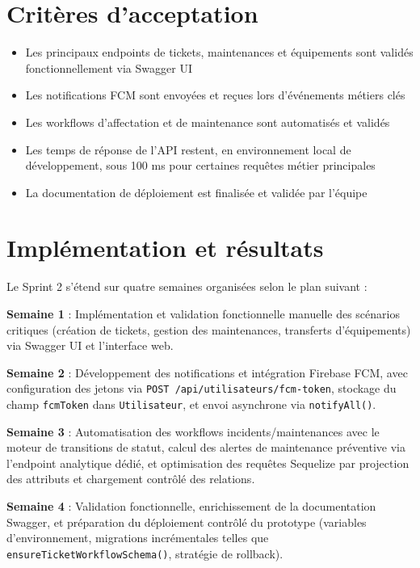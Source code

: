 \section{Critères d'acceptation}
\label{sec:acceptance_criteria_sprint2}

\begin{itemize}
    \item Les principaux endpoints de tickets, maintenances et équipements sont validés fonctionnellement via Swagger UI
    \item Les notifications FCM sont envoyées et reçues lors d'événements métiers clés
    \item Les workflows d'affectation et de maintenance sont automatisés et validés
    \item Les temps de réponse de l'API restent, en environnement local de développement, sous 100 ms pour certaines requêtes métier principales
    \item La documentation de déploiement est finalisée et validée par l'équipe
\end{itemize}

\section{Implémentation et résultats}
\label{sec:implementation_results_sprint2}

Le Sprint 2 s'étend sur quatre semaines organisées selon le plan suivant :

\textbf{Semaine 1} : Implémentation et validation fonctionnelle manuelle des scénarios critiques (création de tickets, gestion des maintenances, transferts d'équipements) via Swagger UI et l'interface web.

\textbf{Semaine 2} : Développement des notifications et intégration Firebase FCM, avec configuration des jetons via \texttt{POST /api/utilisateurs/fcm-token}, stockage du champ \texttt{fcmToken} dans \texttt{Utilisateur}, et envoi asynchrone via \texttt{notifyAll()}.

\textbf{Semaine 3} : Automatisation des workflows incidents/maintenances avec le moteur de transitions de statut, calcul des alertes de maintenance préventive via l'endpoint analytique dédié, et optimisation des requêtes Sequelize par projection des attributs et chargement contrôlé des relations.

\textbf{Semaine 4} : Validation fonctionnelle, enrichissement de la documentation Swagger, et préparation du déploiement contrôlé du prototype (variables d'environnement, migrations incrémentales telles que \texttt{ensureTicketWorkflowSchema()}, stratégie de rollback).

